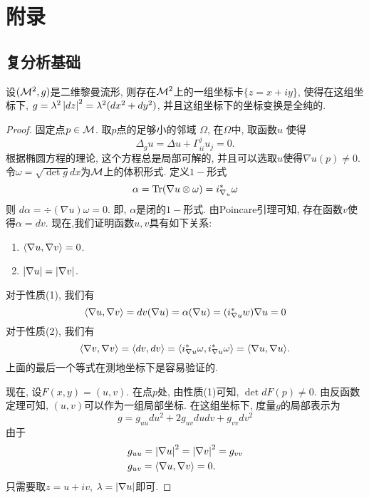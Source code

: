 \chapter{附录}
\section{复分析基础}
\begin{theorem}
    设$({\mathcal{M}}^2, g)$是二维黎曼流形, 则存在${\mathcal{M}}^2$上的一组坐标卡$\{z=x+iy\}$, 使得在这组坐标下, $g=\lambda^2\left | dz \right |^2=\lambda^2(dx^2+dy^2)$, 并且这组坐标下的坐标变换是全纯的.
\end{theorem}
\begin{proof}
    固定点$p \in {\mathcal{M}}$. 取$p$点的足够小的邻域 $\Omega$, 在$\Omega$中, 取函数$u$ 使得
    \begin{equation}
        \Delta_g u= \Delta u + \Gamma^j_{ii}u_j=0.
    \end{equation}
    根据椭圆方程的理论, 这个方程总是局部可解的, 并且可以选取$u$使得$\nabla u(p) \ne 0$. 令$\omega= \sqrt{\det g}dx$为${\mathcal{M}}$上的体积形式. 定义$1-$形式
    \begin{equation}
        \alpha= \text{Tr}(\nabla u \otimes \omega)= i^*_{\nabla_u } \omega
    \end{equation}
    则 $d\alpha= \div(\nabla u)\omega =0$. 即, $\alpha$是闭的$1-$形式. 由Poincare引理可知, 存在函数$v$使得$\alpha= dv$.  现在,我们证明函数$u,v$具有如下关系:
    \begin{enumerate}
        \item ${\left < \nabla u, \nabla v \right >} =0$.
        \item $\left | \nabla u \right |= \left | \nabla v \right |$.
    \end{enumerate}
    对于性质(1), 我们有
    \begin{equation}
        {\left < \nabla u, \nabla v \right >} = dv(\nabla u) = \alpha(\nabla u)= (i^*_{\nabla u} w)\nabla u =0
    \end{equation}
    对于性质(2), 我们有
    \begin{equation}
        {\left < \nabla v, \nabla v \right >} = {\left < dv, dv \right >} = {\left < i^*_{\nabla u}\omega ,  i^*_{\nabla u}\omega \right >}= {\left < \nabla u, \nabla u \right >}.
    \end{equation}
    上面的最后一个等式在测地坐标下是容易验证的. 
    \par 现在, 设$F(x,y)=(u,v)$. 在点$p$处, 由性质(1)可知, $\det dF(p) \ne 0$. 由反函数定理可知, $(u,v)$可以作为一组局部坐标. 在这组坐标下, 度量$g$的局部表示为
    \begin{equation}
        g=g_{uu}du^2+2g_{uv}dudv+g_{vv}dv^2
    \end{equation}
    由于
    \begin{align}
        &g_{uu}= \left | \nabla u \right |^2 = \left | \nabla v \right |^2= g_{vv} \\
        &g_{uv}={\left < \nabla u, \nabla v \right >}=0. 
    \end{align}
    只需要取$z=u+iv$, $\lambda= \left | \nabla u \right |$即可.
\end{proof}
